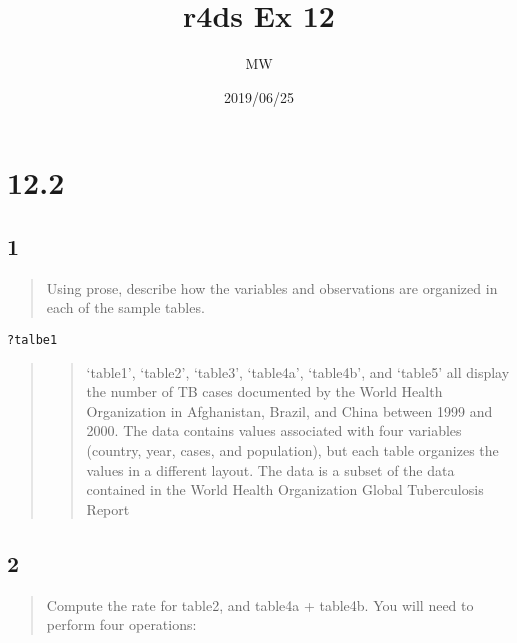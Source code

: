 \documentclass[]{ltjsarticle}
\title{r4ds Ex 12}
\author{MW}
\date{2019/06/25}
\newenvironment{Shaded}{\begin{snugshade}}{\end{snugshade}}
\newcommand{\DataTypeTok}[1]{\textcolor[rgb]{0.13,0.29,0.53}{#1}}
\newcommand{\DecValTok}[1]{\textcolor[rgb]{0.00,0.00,0.81}{#1}}
\newcommand{\KeywordTok}[1]{\textcolor[rgb]{0.13,0.29,0.53}{\textbf{#1}}}
\newcommand{\NormalTok}[1]{#1}
\newcommand{\OperatorTok}[1]{\textcolor[rgb]{0.81,0.36,0.00}{\textbf{#1}}}
\newcommand{\StringTok}[1]{\textcolor[rgb]{0.31,0.60,0.02}{#1}}
\begin{document}
\maketitle

\hypertarget{section}{%
\section{12.2}\label{section}}

\hypertarget{section-1}{%
\subsection{1}\label{section-1}}

\begin{quote}
Using prose, describe how the variables and observations are organized
in each of the sample tables.
\end{quote}

\begin{verbatim}
?talbe1
\end{verbatim}

\begin{quote}
\begin{quote}
`table1', `table2', `table3', `table4a', `table4b', and `table5' all
display the number of TB cases documented by the World Health
Organization in Afghanistan, Brazil, and China between 1999 and 2000.
The data contains values associated with four variables (country, year,
cases, and population), but each table organizes the values in a
different layout. The data is a subset of the data contained in the
World Health Organization Global Tuberculosis Report
\end{quote}
\end{quote}

\hypertarget{section-2}{%
\subsection{2}\label{section-2}}

\begin{quote}
Compute the rate for table2, and table4a + table4b. You will need to
perform four operations:
\end{quote}

\begin{Shaded}
\end{Shaded}
\end{document}
